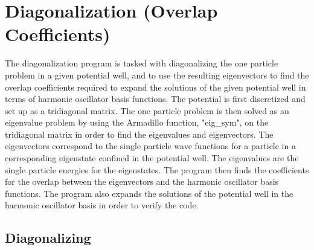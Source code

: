 \documentclass[../main.tex]{subfiles}
\begin{document}
\section{Diagonalization (Overlap Coefficients)}

The diagonalization program is tasked with diagonalizing the one particle problem in a given potential well, and to use the resulting eigenvectors to find the overlap coefficients required to expand the solutions of the given potential well in terms of harmonic oscillator basis functions. The potential is first discretized and set up as a tridiagonal matrix. The one particle problem is then solved as an eigenvalue problem by using the Armadillo function, "eig\_sym", on the tridiagonal matrix in order to find the eigenvalues and eigenvectors. The eigenvectors correspond to the single particle wave functions for a particle in a corresponding eigenstate confined in the potential well. The eigenvalues are the single particle energies for the eigenstates. The program then finds the coefficients for the overlap between the eigenvectors and the harmonic oscillator basis functions. The program also expands the solutions of the potential well in the harmonic oscillator basis in order to verify the code.

\subsection{Diagonalizing}
\end{document}
